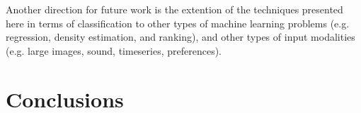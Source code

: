 \documentclass[wcp]{jmlr}
\begin{document}
Another direction for future work is the extention of the techniques presented here in terms of classification to other types of machine learning problems (e.g. regression, density estimation, and ranking),
and other types of input modalities (e.g. large images, sound, timeseries, preferences).



\section{Conclusions}




\end{document}
